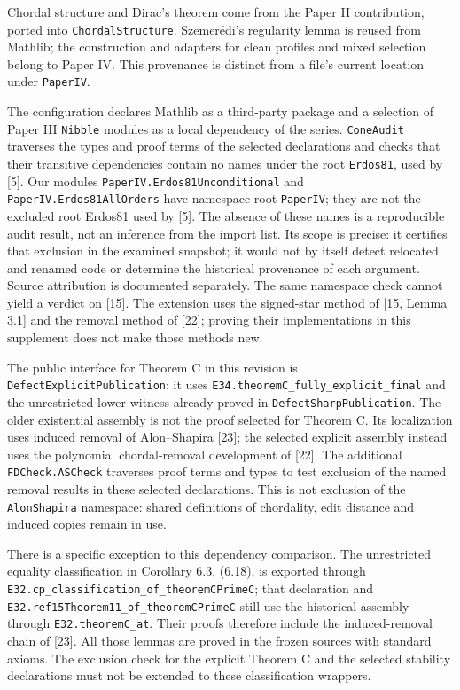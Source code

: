\documentclass[english,11pt,a4paper]{article}
\begin{document}
Chordal structure and Dirac's theorem come from the Paper II
contribution, ported into \nolinkurl{ChordalStructure}. Szemerédi's
regularity lemma is reused from Mathlib; the construction and adapters
for clean profiles and mixed selection belong to Paper IV. This
provenance is distinct from a file's current location under
\nolinkurl{PaperIV}.

The configuration declares Mathlib as a third-party package and a
selection of Paper III \nolinkurl{Nibble} modules as a local dependency of
the series. \nolinkurl{ConeAudit} traverses the types and proof terms of
the selected declarations and checks that their transitive dependencies
contain no names under the root \nolinkurl{Erdos81}, used by {[}5{]}. Our
modules \nolinkurl{PaperIV.Erdos81Unconditional} and
\nolinkurl{PaperIV.Erdos81AllOrders} have namespace root \nolinkurl{PaperIV};
they are not the excluded root Erdos81 used by {[}5{]}. The absence of
these names is a reproducible audit result, not an inference from the
import list. Its scope is precise: it certifies that exclusion in the
examined snapshot; it would not by itself detect relocated and renamed
code or determine the historical provenance of each argument. Source
attribution is documented separately. The same namespace check cannot
yield a verdict on {[}15{]}. The extension uses the signed-star method
of {[}15, Lemma 3.1{]} and the removal method of {[}22{]}; proving their
implementations in this supplement does not make those methods new.

The public interface for Theorem C in this revision is
\nolinkurl{DefectExplicitPublication}: it uses
\nolinkurl{E34.theoremC_fully_explicit_final} and the unrestricted lower
witness already proved in \nolinkurl{DefectSharpPublication}. The older
existential assembly is not the proof selected for Theorem C. Its
localization uses induced removal of Alon--Shapira {[}23{]}; the
selected explicit assembly instead uses the polynomial chordal-removal
development of {[}22{]}. The additional \nolinkurl{FDCheck.ASCheck}
traverses proof terms and types to test exclusion of the named removal
results in these selected declarations. This is not exclusion of the
\nolinkurl{AlonShapira} namespace: shared definitions of chordality, edit
distance and induced copies remain in use.

There is a specific exception to this dependency comparison. The
unrestricted equality classification in Corollary 6.3, (6.18), is
exported through \nolinkurl{E32.cp_classification_of_theoremCPrimeC};
that declaration and \nolinkurl{E32.ref15Theorem11_of_theoremCPrimeC}
still use the historical assembly through \nolinkurl{E32.theoremC_at}.
Their proofs therefore include the induced-removal chain of {[}23{]}.
All those lemmas are proved in the frozen sources with standard axioms.
The exclusion check for the explicit Theorem C and the selected
stability declarations must not be extended to these classification
wrappers.
\end{document}
